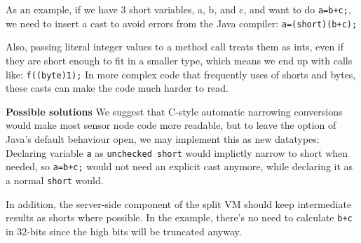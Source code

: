 As an example, if we have 3 short variables, a, b, and c, and want to do 
\texttt{a=b+c;}, we need to insert a cast to avoid errors from the Java compiler: \texttt{a=(short)(b+c);}

Also, passing literal integer values to a method call treats them as ints, even if they are short enough to fit in a smaller type, which means we end up with calls like: \texttt{f((byte)1);}
In more complex code that frequently uses of shorts and bytes, these casts can make the code much harder to read.




\textbf{Possible solutions}
We suggest that C-style automatic narrowing conversions would make most sensor node code more readable, but to leave the option of Java's default behaviour open, we may implement this as new datatypes: Declaring variable \texttt{a} as \texttt{unchecked short} would implictly narrow to short when needed, so \texttt{a=b+c;} would not need an explicit cast anymore, while declaring it as a normal \texttt{short} would.

In addition, the server-side component of the split VM should keep intermediate results as shorts where possible. In the example, there's no need to calculate \texttt{b+c} in 32-bits since the high bits will be truncated anyway.





